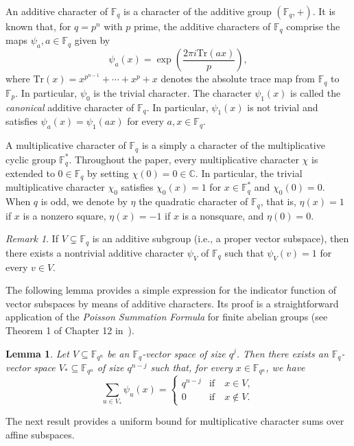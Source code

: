 \documentclass[11pt]{amsart}
\newcommand{\F}{\mathbb F}
\newtheorem{lemma}[theorem]{Lemma}
\theoremstyle{definition}
\theoremstyle{remark}
\newtheorem{remark}[theorem]{Remark}
\begin{document}
An additive character of $\F_q$ is a character of the additive group $(\F_q,+)$. It is known that, for $q=p^n$ with $p$ prime, the additive characters of $\F_q$ comprise the maps $\psi_a, a\in \F_q$ given by $$\psi_a(x)=\exp\left(\frac{2\pi i \mathrm{Tr}(ax)}{p}\right),$$ where $\mathrm{Tr}(x)=x^{p^{n-1}}+\cdots+x^p+x$ denotes the absolute trace map from $\F_q$ to $\F_p$. In particular, $\psi_0$ is the trivial character. The character $\psi_1(x)$ is called the {\em canonical} additive character of $\F_q$. In particular, $\psi_1(x)$ is not trivial and satisfies 
$\psi_a(x)=\psi_1(ax)$ for every $a, x\in \F_{q}$.

A multiplicative character of $\F_q$ is a simply a character of the multiplicative cyclic group $\F_q^*$. Throughout the paper, every multiplicative character $\chi$ is extended to $0\in \F_q$ by setting $\chi(0)=0\in \mathbb C$. In particular, the trivial multiplicative character $\chi_0$ satisfies $\chi_0(x)=1$ for $x\in \F_q^*$ and $\chi_0(0)=0$. When $q$ is odd, we denote by $\eta$ the quadratic character of $\F_q$, that is, $\eta(x)=1$ if $x$ is a nonzero square, $\eta(x)=-1$ if $x$ is a nonsquare, and $\eta(0)=0$.

\begin{remark}\label{rem:rest}
 If $V\subsetneq \F_q$ is an additive subgroup (i.e., a proper vector subspace), then there exists a nontrivial additive character $\psi_V$ of $\F_q$ such that $\psi_V(v)=1$ for every $v\in V$.  
\end{remark}

The following lemma provides a simple expression for the indicator function of vector subspaces by means of additive characters. Its proof is a straightforward application of the {\em Poisson Summation Formula} for  finite abelian groups (see Theorem 1 of Chapter 12 in~\cite{terras}).

\begin{lemma}\label{lem:indicator}
Let $V\subseteq \F_{q^n}$ be an $\F_q$-vector space of size $q^j$. Then there exists an $\F_q$-vector space $V_*\subseteq \F_{q^n}$ of size $q^{n-j}$ such that, for every $x\in \F_{q^n}$, we have
$$\sum_{u\in V_*}\psi_u(x)=\begin{cases}q^{n-j}&\text{if}\quad x\in V,\\ 0&\text{if}\quad x\not\in V.\end{cases}$$    
\end{lemma}

The next result provides a uniform bound for multiplicative character sums over affine subspaces.
\end{document}
